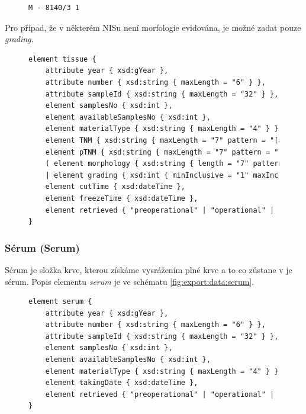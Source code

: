 \begin{figure}[h!] %
\centering
\begin{BVerbatim}
M - 8140/3 1
\end{BVerbatim}
\end{figure}
Pro případ, že v některém NISu není morfologie evidována, je možné zadat pouze \textit{grading}.

\begin{figure}[h!]
\begin{center}
\begin{lstlisting}[language=XML, caption={Element popisující tkáň v~exportním schéma.},
label={fig:export:data:tissue}]
element tissue {
	attribute year { xsd:gYear },
	attribute number { xsd:string { maxLength = "6" } },
	attribute sampleId { xsd:string { maxLength = "32" } },
	element samplesNo { xsd:int },
	element availableSamplesNo { xsd:int },
	element materialType { xsd:string { maxLength = "4" } }
	element TNM { xsd:string { maxLength = "7" pattern = "[a-zA-Z0-9]+" } },
	element pTNM { xsd:string { maxLength = "7" pattern = "[a-zA-Z0-9]+" } },
	( element morphology { xsd:string { length = "7" pattern = "[0-9]{4}/[0-9]{2}"} } 
	| element grading { xsd:int { minInclusive = "1" maxInclusive = "9" } } ),
	element cutTime { xsd:dateTime },
	element freezeTime { xsd:dateTime },
	element retrieved { "preoperational" | "operational" | "post" | "unknown" }
}
\end{lstlisting}
\end{center}
\end{figure}

\subsubsection{Sérum (Serum)}
Sérum je složka krve, kterou získáme vysrážením plné krve a to co zůstane v  je sérum. Popis elementu \textit{serum} je ve schématu \ref{fig:export:data:serum}.
\begin{figure}[hbtp]
\begin{center}
\begin{lstlisting}[language=XML, caption={Element popisující sérum v~exportním schéma.},
label={fig:export:data:serum}]
element serum {
	attribute year { xsd:gYear },
	attribute number { xsd:string { maxLength = "6" } },
	attribute sampleId { xsd:string { maxLength = "32" } },
	element samplesNo { xsd:int },
	element availableSamplesNo { xsd:int },
	element materialType { xsd:string { maxLength = "4" } }
	element takingDate { xsd:dateTime },
	element retrieved { "preoperational" | "operational" | "post" | "unknown" }
}
\end{lstlisting}
\end{center}
\end{figure}
